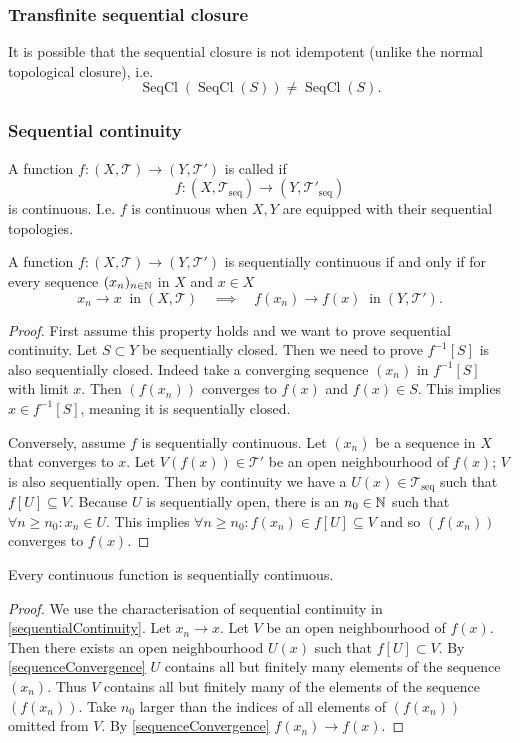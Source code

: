 \subsubsection{Transfinite sequential closure}
It is possible that the sequential closure is not idempotent (unlike the normal topological closure), i.e.
\[ \operatorname{SeqCl}(\operatorname{SeqCl}(S)) \neq \operatorname{SeqCl}(S). \]

\subsubsection{Sequential continuity}
\begin{definition}
A function $f:(X,\mathcal{T})\to(Y,\mathcal{T}')$ is called  if
\[ f:(X,\mathcal{T}_\text{seq})\to(Y,\mathcal{T}'_\text{seq}) \]
is continuous. I.e. $f$ is continuous when $X,Y$ are equipped with their sequential topologies.
\end{definition}

\begin{proposition} \label{sequentialContinuity}
A function $f:(X,\mathcal{T})\to(Y,\mathcal{T}')$ is sequentially continuous \textup{if and only if} for every sequence $(x_n)_{n\in\mathbb{N}}$ in $X$ and $x\in X$
\[ x_n \to x \;\;\text{in}\; (X,\mathcal{T}) \quad\implies\quad f(x_n)\to f(x) \;\;\text{in}\; (Y,\mathcal{T}'). \]
\end{proposition}
\begin{proof}
First assume this property holds and we want to prove sequential continuity. Let $S\subset Y$ be sequentially closed. Then we need to prove $f^{-1}[S]$ is also sequentially closed. Indeed take a converging sequence $(x_n)$ in $f^{-1}[S]$ with limit $x$. Then $(f(x_n))$ converges to $f(x)$ and $f(x)\in S$. This implies $x\in f^{-1}[S]$, meaning it is sequentially closed. 

Conversely, assume $f$ is sequentially continuous. Let $(x_n)$ be a sequence in $X$ that converges to $x$. Let $V(f(x))\in \mathcal{T}'$ be an open neighbourhood of $f(x)$; $V$ is also sequentially open. Then by continuity we have a $U(x)\in\mathcal{T}_\text{seq}$ such that $f[U]\subseteq V$. Because $U$ is sequentially open, there is an $n_0\in\mathbb{N}$ such that $\forall n\geq n_0: x_n\in U$.
This implies $\forall n\geq n_0: f(x_n)\in f[U]\subseteq V$ and so $(f(x_n))$ converges to $f(x)$.
\end{proof}
\begin{proposition}
Every continuous function is sequentially continuous.
\end{proposition}
\begin{proof}
We use the characterisation of sequential continuity in \ref{sequentialContinuity}. Let $x_n\to x$. Let $V$ be an open neighbourhood of $f(x)$. Then there exists an open neighbourhood $U(x)$ such that $f[U]\subset V$. By \ref{sequenceConvergence} $U$ contains all but finitely many elements of the sequence $(x_n)$. Thus $V$ contains all but finitely many of the elements of the sequence $(f(x_n))$. Take $n_0$ larger than the indices of all elements of $(f(x_n))$ omitted from $V$. By \ref{sequenceConvergence} $f(x_n)\to f(x)$.
\end{proof}

